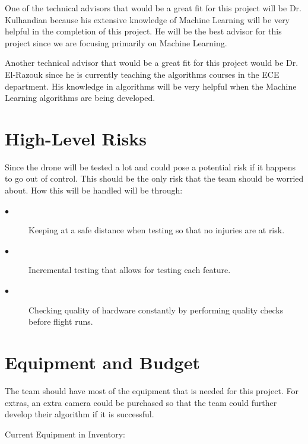 \documentclass[12pt,onecolumn]{IEEEtran}			%
\begin{document}
One of the technical advisors that would be a great fit for this project will be Dr. Kulhandian because his extensive knowledge of Machine Learning will be very helpful in the completion of this project. He will be the best advisor for this project since we are focusing primarily on Machine Learning.

Another technical advisor that would be a great fit for this project would be Dr. El-Razouk since he is currently teaching the algorithms courses in the ECE department. His knowledge in algorithms will be very helpful when the Machine Learning algorithms are being developed. 



\section{High-Level Risks}
Since the drone will be tested a lot and could pose a potential risk if it happens to go out of control. This should be the only risk that the team should be worried about. How this will be handled will be through: 
\vspace{12pt} 
 \begin{description}
  \item[$\bullet$ ] Keeping at a safe distance when testing so that no injuries are at risk. 
  \item[$\bullet$ ] Incremental testing that allows for testing each feature. 
  \item[$\bullet$ ] Checking quality of hardware constantly by performing quality checks before flight runs. 
\end{description}



\section{Equipment and Budget}
The team should have most of the equipment that is needed for this project. For extras, an extra camera could be purchased so that the team could further develop their algorithm if it is successful. 
\vspace{12pt} 

Current Equipment in Inventory:
\end{document}

